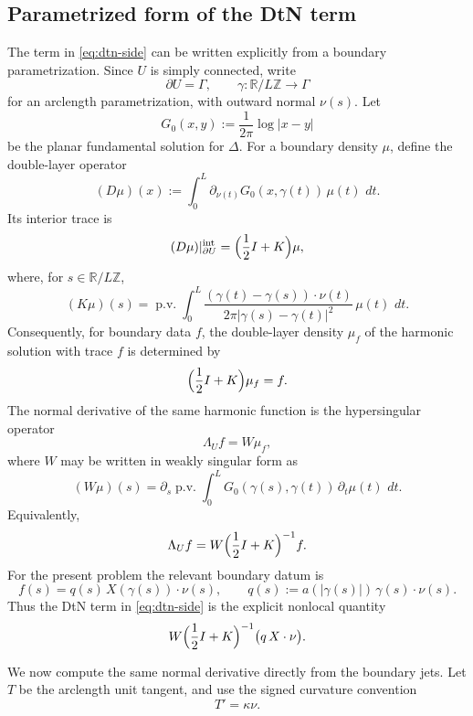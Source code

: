 \documentclass[11pt]{article}
\newcommand{\R}{\mathbb R}
\newcommand{\dd}{\,d}
\newcommand{\1}{\mathbf 1}
\begin{document}
\subsection{Parametrized form of the DtN term}

The term in \eqref{eq:dtn-side} can be written explicitly from a boundary
parametrization.  Since \(U\) is simply connected, write
\[
  \partial U=\Gamma,\qquad
  \gamma:\R/L\mathbb Z\to\Gamma
\]
for an arclength parametrization, with outward normal \(\nu(s)\).  Let
\[
  G_0(x,y):=\frac{1}{2\pi}\log|x-y|
\]
be the planar fundamental solution for \(\Delta\).  For a boundary density \(\mu\),
define the double-layer operator
\[
  (D\mu)(x):=
  \int_0^{L}
  \partial_{\nu(t)}G_0(x,\gamma(t))\,\mu(t)\,\dd t .
\]
Its interior trace is
\[
  (D\mu)|_{\partial U}^{\mathrm{int}}
  =
  \Bigl(\frac12 I+K\Bigr)\mu,
\]
where, for \(s\in\R/L\mathbb Z\),
\begin{equation}\label{eq:K-operator}
  (K\mu)(s)
  =
  \operatorname{p.v.}\int_0^{L}
  \frac{(\gamma(t)-\gamma(s))\cdot\nu(t)}
       {2\pi|\gamma(s)-\gamma(t)|^2}
  \,\mu(t)\,\dd t .
\end{equation}
Consequently, for boundary data \(f\), the double-layer density
\(\mu_f\) of the harmonic solution with trace \(f\) is determined by
\begin{equation}\label{eq:mu-equation}
  \Bigl(\frac12 I+K\Bigr)\mu_f=f .
\end{equation}
The normal derivative of the same harmonic function is the hypersingular
operator
\[
  \Lambda_U f=W\mu_f,
\]
where \(W\) may be written in weakly singular form as
\begin{equation}\label{eq:W-operator}
  (W\mu)(s)
  =
  \partial_s
  \operatorname{p.v.}\int_0^{L}
  G_0(\gamma(s),\gamma(t))\,\partial_t\mu(t)\,\dd t .
\end{equation}
Equivalently,
\begin{equation}\label{eq:param-dtn}
  \Lambda_U f
  =
  W\Bigl(\frac12 I+K\Bigr)^{-1}f .
\end{equation}
For the present problem the relevant boundary datum is
\begin{equation}\label{eq:f-def}
  f(s)
  =
  q(s)\,X(\gamma(s))\cdot\nu(s),
  \qquad
  q(s):=
  a(|\gamma(s)|)\,\gamma(s)\cdot\nu(s).
\end{equation}
Thus the DtN term in \eqref{eq:dtn-side} is the explicit nonlocal quantity
\[
  W\Bigl(\frac12 I+K\Bigr)^{-1}
  \bigl(q\,X\cdot\nu\bigr).
\]

We now compute the same normal derivative directly from the boundary jets.  Let
\(T\) be the arclength unit tangent, and use the signed curvature convention
\[
  T'=\kappa\nu .
\]
\end{document}
